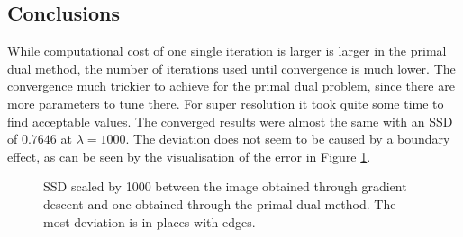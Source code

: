 \documentclass{paper}
\begin{document}
\subsection*{Conclusions}
While computational cost of one single iteration is larger is larger 
in the primal dual method, the number of iterations used until convergence 
is much lower. The convergence much trickier to achieve for the primal dual problem,
since there are more parameters to tune there. For super resolution it took 
quite some time to find acceptable values. 
The converged results were almost the same with an SSD of $0.7646$ at $\lambda = 1000$.
The deviation does not seem to be caused by a boundary effect, as can be seen
by the visualisation of the error in Figure \ref{fig:gradient_descent_vs_primal_dual}.
\begin{figure}[ht!]%
\centering
{}
\caption{SSD scaled by 1000 between the image obtained through gradient descent and one obtained
through the primal dual method. The most deviation is in places with edges. }
\label{fig:gradient_descent_vs_primal_dual}
\end{figure}
\end{document}
